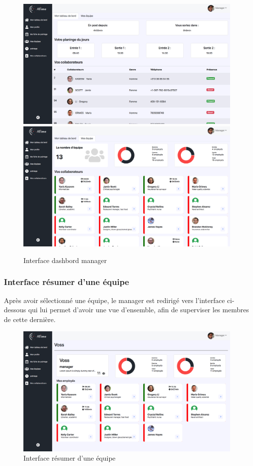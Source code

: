 \begin{figure}[h!]
    \centering
    \includegraphics[scale=0.326 ]{images/interface/dashbord_manager1.png}
    \includegraphics[scale=0.326 ]{images/interface/dashbord_manager.png}
    \caption{Interface dashbord manager}
    \label{fig96}
\end{figure}

\subsubsection*{Interface résumer d'une équipe}
Après avoir sélectionné une équipe, le manager est redirigé vers l'interface 
ci-dessous qui lui permet d'avoir une vue d'ensemble, afin de superviser les 
membres de cette dernière.

\begin{figure}[h!]
    \centering
    \includegraphics[scale=0.35 ]{images/interface/team_view.png}
    \caption{Interface résumer d'une équipe}
    \label{fig97}
\end{figure}

